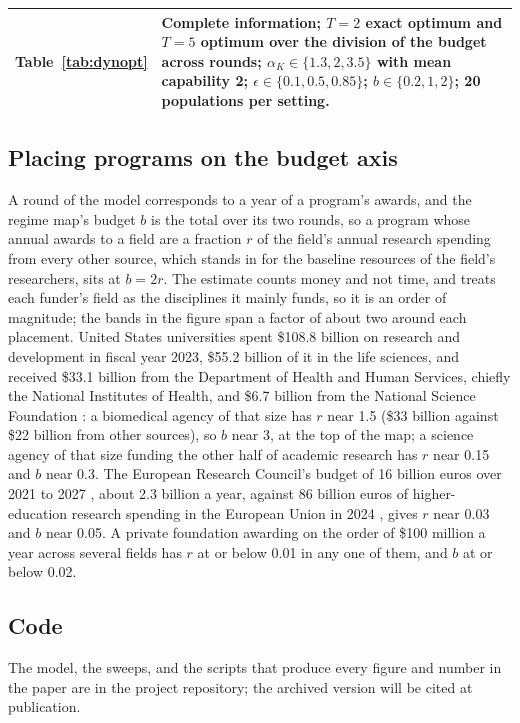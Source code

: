 \begin{table}[h]
\begin{tabular}{@{}p{2.1cm}p{10.2cm}@{}}
Table~\ref{tab:dynopt} & Complete information; $T = 2$ exact optimum and $T = 5$ optimum over the division of the budget across rounds; $\alpha_K \in \{1.3, 2, 3.5\}$ with mean capability 2; $\epsilon \in \{0.1, 0.5, 0.85\}$; $b \in \{0.2, 1, 2\}$; 20 populations per setting. \\
\bottomrule
\end{tabular}
\end{table}

\subsection*{Placing programs on the budget axis}
A round of the model corresponds to a year of a program's awards, and the regime map's budget $b$ is the total over its two rounds, so a program whose annual awards to a field are a fraction $r$ of the field's annual research spending from every other source, which stands in for the baseline resources of the field's researchers, sits at $b = 2r$. The estimate counts money and not time, and treats each funder's field as the disciplines it mainly funds, so it is an order of magnitude; the bands in the figure span a factor of about two around each placement. United States universities spent \$108.8 billion on research and development in fiscal year 2023, \$55.2 billion of it in the life sciences, and received \$33.1 billion from the Department of Health and Human Services, chiefly the National Institutes of Health, and \$6.7 billion from the National Science Foundation \citep{NCSES2025HERD}: a biomedical agency of that size has $r$ near 1.5 (\$33 billion against \$22 billion from other sources), so $b$ near 3, at the top of the map; a science agency of that size funding the other half of academic research has $r$ near 0.15 and $b$ near 0.3. The European Research Council's budget of 16 billion euros over 2021 to 2027 \citep{ERC2025}, about 2.3 billion a year, against 86 billion euros of higher-education research spending in the European Union in 2024 \citep{Eurostat2025}, gives $r$ near 0.03 and $b$ near 0.05. A private foundation awarding on the order of \$100 million a year across several fields has $r$ at or below 0.01 in any one of them, and $b$ at or below 0.02.

\subsection*{Code}
The model, the sweeps, and the scripts that produce every figure and number in the paper are in the project repository; the archived version will be cited at publication. %
